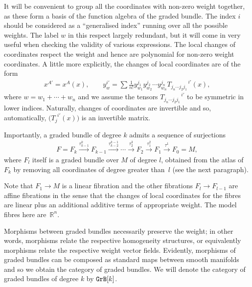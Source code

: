 \documentclass[pdftex]{sigma}
\newcommand{\catname}[1]{\textnormal{\texttt{#1}}}
\newcommand{\GrB}{\catname{GrB}}
\numberwithin{equation}{section}
\begin{document}
It will be convenient to group all the coordinates with non-zero weight together, as these form a basis of the function algebra of the graded bundle. The index $i$ should be considered as a ``generalised index'' running over all the possible weights. The label $w$ in this respect largely redundant, but it will come in very useful when checking the validity of various expressions. The local changes of coordinates respect the weight and hence are polynomial for non-zero weight coordinates. A little more explicitly, the changes of local coordinates are of the form
\begin{gather*}
 x^{A'} = x^{A}(x), \qquad y^{i'}_{w} = \sum \frac{1}{n!} y^{j_{1}}_{w_{1}} y^{j_{2}}_{w_{2}} \cdots y^{j_{n}}_{w_{n}}T_{j_{n} \cdots j_{2} j_{1}}^{\:\:\:\:\:\:\:\:\:\:\:\: \:\:\:\: i'}(x), \end{gather*}
where $w=w_1+\cdots+w_n$ and we assume the tensors $T_{j_{n} \cdots j_{2} j_{1}}^{\:\:\:\:\:\:\:\:\:\:\:\: \:\:\:\: i'}$ to be symmetric in lower indices. Naturally, changes of coordinates are invertible and so, automatically, $\big(T_{j}^{\:\: i'}(x)\big)$ is an invertible matrix.

Importantly, a graded bundle of degree $k$ admits a sequence of surjections
\begin{gather}\label{eqn:fibrations}
F=F_{k} \stackrel{\tau^{k}_{k-1}}{\longrightarrow} F_{k-1} \stackrel{\tau^{k-1}_{k-2}}{\longrightarrow} \cdots \stackrel{\tau^{3}_2}{\longrightarrow} F_{2} \stackrel{\tau^{2}_1}{\longrightarrow}F_{1} \stackrel{\tau^{1}}{\longrightarrow} F_{0} = M,
\end{gather}
where $F_l$ itself is a graded bundle over $M$ of degree $l$, obtained from the atlas of $F_k$ by removing all coordinates of degree greater than~$l$ (see the next paragraph).

Note that $F_{1} \rightarrow M$ is a linear f\/ibration and the other f\/ibrations $F_{l} \rightarrow F_{l-1}$ are af\/f\/ine f\/ibrations in the sense that the changes of local coordinates for the f\/ibres are linear plus an additional additive terms of appropriate weight. The model f\/ibres here are~$\mathbb{R}^{n}$.

Morphisms between graded bundles necessarily preserve the weight; in other words, morphisms relate the respective homogeneity structures, or equivalently morphisms relate the respective weight vector f\/ields. Evidently, morphisms of graded bundles can be composed as standard maps between smooth manifolds and so we obtain the category of graded bundles. We will denote the category of graded bundles of degree $k$ by $\GrB[k]$.
\end{document}
